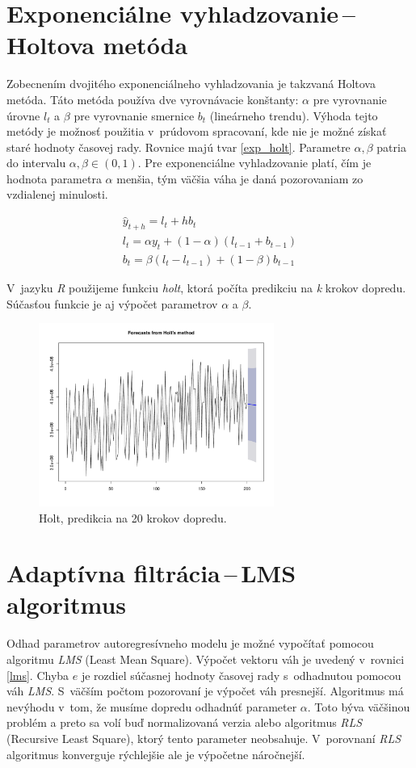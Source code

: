 \documentclass[12pt,a4paper,oneside,final]{article}
\theoremstyle{definition}
\theoremstyle{remark}
\numberwithin{equation}{section}
\begin{document}
\section{Exponenciálne vyhladzovanie\,--\,Holtova metóda}
Zobecnením dvojitého exponenciálneho vyhladzovania je takzvaná Holtova metóda.
Táto metóda používa dve vyrovnávacie konštanty: $\alpha$ pre vyrovnanie úrovne $l_t$
a $\beta$ pre vyrovnanie smernice $b_t$ (lineárneho trendu).
Výhoda tejto metódy je možnosť použitia v~prúdovom spracovaní, kde nie je možné získať staré hodnoty časovej rady. 
Rovnice majú tvar \ref{exp_holt}. Parametre $\alpha, \beta$ patria do intervalu 
$\alpha,\beta \in (0,1)$. Pre exponenciálne vyhladzovanie platí, 
čím je hodnota parametra $\alpha$ menšia, tým väčšia váha je daná pozorovaniam zo
vzdialenej minulosti.

\begin{eqnarray} \label{exp_holt}
    \hat{y}_{t+h} = l_{t} + hb_{t} \\
    \nonumber l_t = \alpha y_t + (1 - \alpha) (l_{t-1} + b_{t-1}) \\
    \nonumber b_t = \beta (l_t - l_{t-1}) + (1 - \beta)b_{t-1} 
\end{eqnarray}
 
V~jazyku \emph{R} použijeme funkciu \emph{holt}, ktorá počíta predikciu na \emph{k} krokov 
dopredu. Súčasťou funkcie je aj výpočet parametrov $\alpha$ a $\beta$.

\begin{figure}[H]
    \begin{center}
        \includegraphics[width=.8\textwidth,height=6cm]{images/heap_holt.pdf}
        \caption{Holt, predikcia na 20 krokov dopredu.}
        \label{obr:heap_holt}
    \end{center}
\end{figure}

\section{Adaptívna filtrácia\,--\,LMS algoritmus}
Odhad parametrov autoregresívneho modelu je možné vypočítať 
pomocou algoritmu \emph{LMS} (Least Mean Square). Výpočet vektoru váh je uvedený
v~rovnici \ref{lms}. Chyba $e$ je rozdiel súčasnej hodnoty časovej rady s~odhadnutou pomocou
váh \emph{LMS}. S~väčším počtom pozorovaní je výpočet váh presnejší. Algoritmus 
má nevýhodu v~tom, že musíme dopredu odhadnúť parameter $\alpha$. Toto býva väčšinou problém 
a preto sa volí buď normalizovaná verzia alebo algoritmus \emph{RLS} (Recursive Least
Square), ktorý tento parameter neobsahuje. V~porovnaní \emph{RLS} algoritmus konverguje
rýchlejšie ale je výpočetne náročnejší.  
\end{document}
